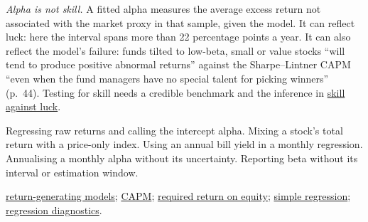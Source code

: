 \begin{qfmethod}
\emph{Alpha is not skill.} A fitted alpha measures the average excess return not associated with the market proxy in that sample, given the model. It can reflect luck: here the interval spans more than 22 percentage points a year. It can also reflect the model's failure: funds tilted to low-beta, small or value stocks ``will tend to produce positive abnormal returns'' against the Sharpe--Lintner CAPM ``even when the fund managers have no special talent for picking winners'' (p.~44). Testing for skill needs a credible benchmark and the inference in \hyperref[meth:skill-luck-significance-tests]{skill against luck}.

 Regressing raw returns and calling the intercept alpha. Mixing a stock's total return with a price-only index. Using an annual bill yield in a monthly regression. Annualising a monthly alpha without its uncertainty. Reporting beta without its interval or estimation window.

 \hyperref[mod:return-generating-models]{return-generating models}; \hyperref[mod:capm-sml]{CAPM}; \hyperref[meth:required-return-on-equity]{required return on equity}; \hyperref[meth:simple-regression-estimation]{simple regression}; \hyperref[meth:regression-diagnostics-anova]{regression diagnostics}.

\end{qfmethod}

